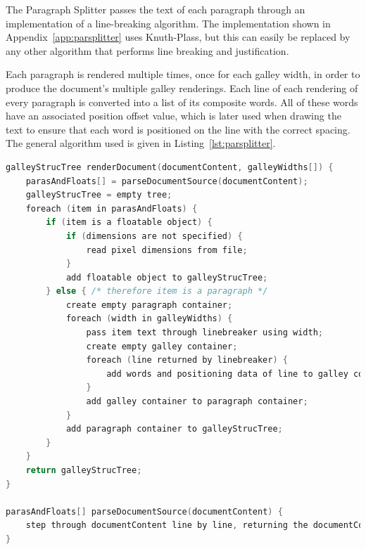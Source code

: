 The Paragraph Splitter passes the text of each paragraph through an implementation of a line-breaking algorithm. The implementation shown in Appendix~\ref{app:parsplitter} uses Knuth-Plass\cite{Knuth1981}, but this can easily be replaced by any other algorithm that performs line breaking and justification.

Each paragraph is rendered multiple times, once for each galley width, in order to produce the document's multiple galley renderings. Each line of each rendering of every paragraph is converted into a list of its composite words. All of these words have an associated position offset value, which is later used when drawing the text to ensure that each word is positioned on the line with the correct spacing. The general algorithm used is given in Listing~\ref{lst:parsplitter}.


\begin{lstlisting}[label=lst:parsplitter,language=c,captionpos=b,float,basicstyle=\ttfamily\footnotesize,caption={[Algorithm used by the Paragraph Splitter]The algorithm followed by the Paragraph Splitter. Firstly the source of the document is parsed to break it into its initial logical blocks: one block per paragraph and one block per float, in the order encountered in the document source. These blocks are then processed further depending on their type. Floats may be probed for their pixel dimensions if no size was specified, and are then added to the Galley Structure Tree. Paragraphs have their content passed through a line breaking algorithm, once for each specified width.}]
galleyStrucTree renderDocument(documentContent, galleyWidths[]) {
    parasAndFloats[] = parseDocumentSource(documentContent);
    galleyStrucTree = empty tree;
    foreach (item in parasAndFloats) {
        if (item is a floatable object) {
            if (dimensions are not specified) {
                read pixel dimensions from file;
            }
            add floatable object to galleyStrucTree;
        } else { /* therefore item is a paragraph */
            create empty paragraph container;
            foreach (width in galleyWidths) {
                pass item text through linebreaker using width;
                create empty galley container;
                foreach (line returned by linebreaker) {
                    add words and positioning data of line to galley container;
                }
                add galley container to paragraph container;
            }
            add paragraph container to galleyStrucTree;
        }
    }
    return galleyStrucTree;
}

parasAndFloats[] parseDocumentSource(documentContent) {
    step through documentContent line by line, returning the documentContent broken into an array of strings with one element per paragraph and per floatable object;
}

\end{lstlisting}


